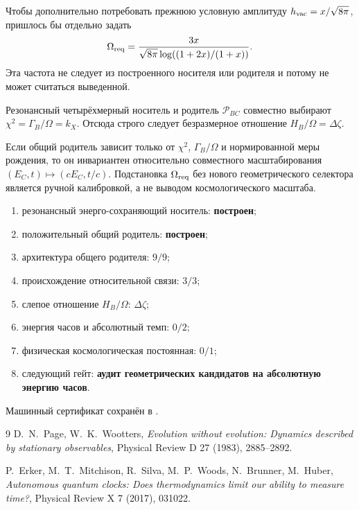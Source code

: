 Чтобы дополнительно потребовать прежнюю условную амплитуду
$h_{\rm vac}=x/\sqrt{8\pi}$, пришлось бы отдельно задать
\begin{equation}
 \Omega_{\rm req}
 =\frac{3x}{\sqrt{8\pi}\log((1+2x)/(1+x))}.
 \label{eq:v10-clock-required-frequency}
\end{equation}
Эта частота не следует из построенного носителя или родителя и потому не
может считаться выведенной.

\begin{theorem}
Резонансный четырёхмерный носитель и родитель
$\mathcal P_{BC}$ совместно выбирают $\chi^2=\Gamma_B/\Omega=k_X$.
Отсюда строго следует безразмерное отношение
$H_B/\Omega=\Delta\zeta$.
\end{theorem}

\begin{nogocriterion}
Если общий родитель зависит только от $\chi^2$, $\Gamma_B/\Omega$ и
нормированной меры рождения, то он инвариантен относительно совместного
масштабирования $(E_C,t)\mapsto(cE_C,t/c)$. Подстановка
$\Omega_{\rm req}$ без нового геометрического селектора является ручной
калибровкой, а не выводом космологического масштаба.
\end{nogocriterion}

\begin{protocol}\begin{enumerate}
\item резонансный энерго-сохраняющий носитель: \textbf{построен};
\item положительный общий родитель: \textbf{построен};
\item архитектура общего родителя: \textbf{$9/9$};
\item происхождение относительной связи: \textbf{$3/3$};
\item слепое отношение $H_B/\Omega$: \textbf{$\Delta\zeta$};
\item энергия часов и абсолютный темп: \textbf{$0/2$};
\item физическая космологическая постоянная: \textbf{$0/1$};
\item следующий гейт: \textbf{аудит геометрических кандидатов на
абсолютную энергию часов}.
\end{enumerate}\end{protocol}

Машинный сертификат сохранён в
.

\begin{thebibliography}{9}
D.~N.~Page, W.~K.~Wootters,
\emph{Evolution without evolution: Dynamics described by stationary
observables}, Physical Review D 27 (1983), 2885--2892.

P.~Erker, M.~T.~Mitchison, R.~Silva, M.~P.~Woods, N.~Brunner,
M.~Huber,
\emph{Autonomous quantum clocks: Does thermodynamics limit our ability to
measure time?}, Physical Review X 7 (2017), 031022.
\end{thebibliography}